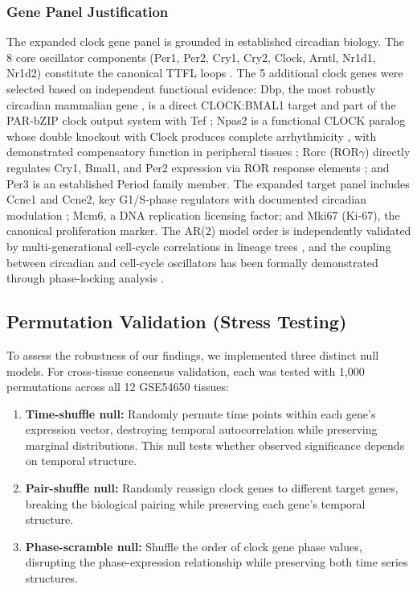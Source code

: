 \documentclass[11pt,a4paper]{article}
\begin{document}
\subsubsection{Gene Panel Justification}

The expanded clock gene panel is grounded in established circadian biology. The 8 core oscillator components (Per1, Per2, Cry1, Cry2, Clock, Arntl, Nr1d1, Nr1d2) constitute the canonical TTFL loops \citep{takahashi2017transcriptional}. The 5 additional clock genes were selected based on independent functional evidence: Dbp, the most robustly circadian mammalian gene \citep{wuarin1990dbp}, is a direct CLOCK:BMAL1 target \citep{ripperger2000clock} and part of the PAR-bZIP clock output system with Tef \citep{gachon2006parbzip}; Npas2 is a functional CLOCK paralog \citep{reick2001npas2} whose double knockout with Clock produces complete arrhythmicity \citep{debruyne2007clock}, with demonstrated compensatory function in peripheral tissues \citep{shi2016npas2}; Rorc (ROR$\gamma$) directly regulates Cry1, Bmal1, and Per2 expression via ROR response elements \citep{takeda2012rorc}; and Per3 is an established Period family member. The expanded target panel includes Ccne1 and Ccne2, key G1/S-phase regulators \citep{siu2010cycline} with documented circadian modulation \citep{farshadi2020clockcellcycle}; Mcm6, a DNA replication licensing factor; and Mki67 (Ki-67), the canonical proliferation marker. The AR(2) model order is independently validated by multi-generational cell-cycle correlations in lineage trees \citep{sandler2015lineage}, and the coupling between circadian and cell-cycle oscillators has been formally demonstrated through phase-locking analysis \citep{feillet2014phaselocking}.

\subsection{Permutation Validation (Stress Testing)}

To assess the robustness of our findings, we implemented three distinct null models. For cross-tissue consensus validation, each was tested with 1,000 permutations across all 12 GSE54650 tissues:

\begin{enumerate}
    \item \textbf{Time-shuffle null:} Randomly permute time points within each gene's expression vector, destroying temporal autocorrelation while preserving marginal distributions. This null tests whether observed significance depends on temporal structure.
    
    \item \textbf{Pair-shuffle null:} Randomly reassign clock genes to different target genes, breaking the biological pairing while preserving each gene's temporal structure.
    
    \item \textbf{Phase-scramble null:} Shuffle the order of clock gene phase values, disrupting the phase-expression relationship while preserving both time series structures.
\end{enumerate}
\end{document}
